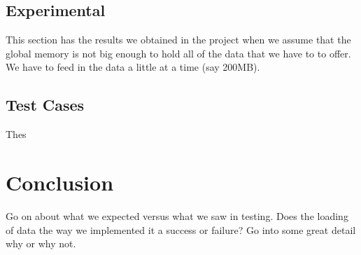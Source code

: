 \documentclass[twocolumn]{article}
\begin{document}
\subsection{Experimental}
This section has the results we obtained in the project when we assume that the global memory is not big enough to hold all of the data that we have to to offer. We have to feed in the data a little at a time (say 200MB).

\subsection{Test Cases}
Thes


\section{Conclusion}
Go on about what we expected versus what we saw in testing. Does the loading of data the way we implemented it a success or failure? Go into some great detail why or why not.








\end{document}
